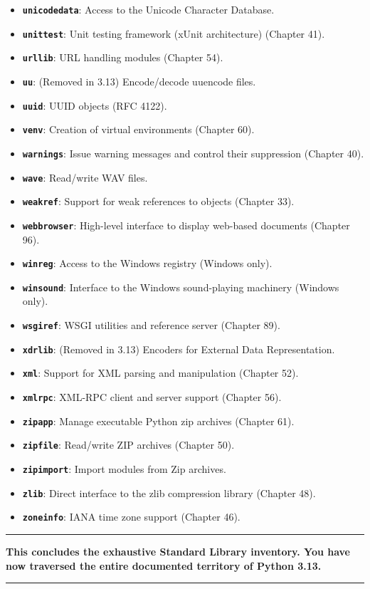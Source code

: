 \begin{itemize}
\tightlist
\item
  \textbf{\passthrough{\lstinline!unicodedata!}}: Access to the Unicode
  Character Database.
\item
  \textbf{\passthrough{\lstinline!unittest!}}: Unit testing framework
  (xUnit architecture) (Chapter 41).
\item
  \textbf{\passthrough{\lstinline!urllib!}}: URL handling modules
  (Chapter 54).
\item
  \textbf{\passthrough{\lstinline!uu!}}: (Removed in 3.13) Encode/decode
  uuencode files.
\item
  \textbf{\passthrough{\lstinline!uuid!}}: UUID objects (RFC 4122).
\item
  \textbf{\passthrough{\lstinline!venv!}}: Creation of virtual
  environments (Chapter 60).
\item
  \textbf{\passthrough{\lstinline!warnings!}}: Issue warning messages
  and control their suppression (Chapter 40).
\item
  \textbf{\passthrough{\lstinline!wave!}}: Read/write WAV files.
\item
  \textbf{\passthrough{\lstinline!weakref!}}: Support for weak
  references to objects (Chapter 33).
\item
  \textbf{\passthrough{\lstinline!webbrowser!}}: High-level interface to
  display web-based documents (Chapter 96).
\item
  \textbf{\passthrough{\lstinline!winreg!}}: Access to the Windows
  registry (Windows only).
\item
  \textbf{\passthrough{\lstinline!winsound!}}: Interface to the Windows
  sound-playing machinery (Windows only).
\item
  \textbf{\passthrough{\lstinline!wsgiref!}}: WSGI utilities and
  reference server (Chapter 89).
\item
  \textbf{\passthrough{\lstinline!xdrlib!}}: (Removed in 3.13) Encoders
  for External Data Representation.
\item
  \textbf{\passthrough{\lstinline!xml!}}: Support for XML parsing and
  manipulation (Chapter 52).
\item
  \textbf{\passthrough{\lstinline!xmlrpc!}}: XML-RPC client and server
  support (Chapter 56).
\item
  \textbf{\passthrough{\lstinline!zipapp!}}: Manage executable Python
  zip archives (Chapter 61).
\item
  \textbf{\passthrough{\lstinline!zipfile!}}: Read/write ZIP archives
  (Chapter 50).
\item
  \textbf{\passthrough{\lstinline!zipimport!}}: Import modules from Zip
  archives.
\item
  \textbf{\passthrough{\lstinline!zlib!}}: Direct interface to the zlib
  compression library (Chapter 48).
\item
  \textbf{\passthrough{\lstinline!zoneinfo!}}: IANA time zone support
  (Chapter 46).
\end{itemize}

\begin{center}\rule{0.5\linewidth}{0.5pt}\end{center}

\textbf{This concludes the exhaustive Standard Library inventory. You
have now traversed the entire documented territory of Python 3.13.}

\begin{center}\rule{0.5\linewidth}{0.5pt}\end{center}
